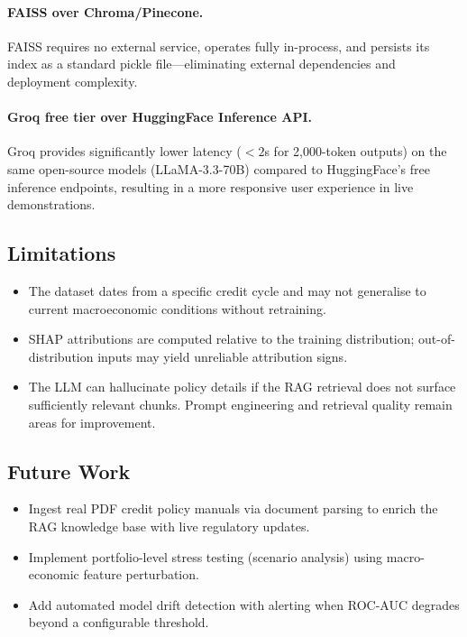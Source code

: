 \documentclass[11pt,a4paper]{article}
\begin{document}
\paragraph{FAISS over Chroma/Pinecone.}
FAISS requires no external service, operates fully in-process, and persists its index
as a standard pickle file---eliminating external dependencies and deployment complexity.

\paragraph{Groq free tier over HuggingFace Inference API.}
Groq provides significantly lower latency ($<2$s for 2,000-token outputs) on the same
open-source models (LLaMA-3.3-70B) compared to HuggingFace's free inference endpoints,
resulting in a more responsive user experience in live demonstrations.

\subsection{Limitations}

\begin{itemize}
    \item The dataset dates from a specific credit cycle and may not generalise to current
          macroeconomic conditions without retraining.
    \item SHAP attributions are computed relative to the training distribution; out-of-
          distribution inputs may yield unreliable attribution signs.
    \item The LLM can hallucinate policy details if the RAG retrieval does not surface
          sufficiently relevant chunks. Prompt engineering and retrieval quality remain
          areas for improvement.
\end{itemize}

\subsection{Future Work}

\begin{itemize}
    \item Ingest real PDF credit policy manuals via document parsing to enrich the RAG
          knowledge base with live regulatory updates.
    \item Implement portfolio-level stress testing (scenario analysis) using
          macro-economic feature perturbation.
    \item Add automated model drift detection with alerting when ROC-AUC degrades beyond a
          configurable threshold.
\end{itemize}
\end{document}
